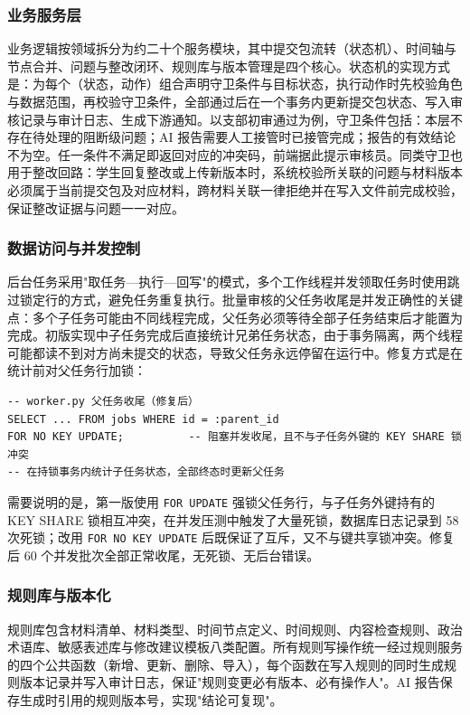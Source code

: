 \documentclass[12pt,a4paper]{ctexart}
\begin{document}
\subsubsection{业务服务层}

业务逻辑按领域拆分为约二十个服务模块，其中提交包流转（状态机）、时间轴与节点合并、问题与整改闭环、规则库与版本管理是四个核心。状态机的实现方式是：为每个（状态，动作）组合声明守卫条件与目标状态，执行动作时先校验角色与数据范围，再校验守卫条件，全部通过后在一个事务内更新提交包状态、写入审核记录与审计日志、生成下游通知。以支部初审通过为例，守卫条件包括：本层不存在待处理的阻断级问题；AI 报告需要人工接管时已接管完成；报告的有效结论不为空。任一条件不满足即返回对应的冲突码，前端据此提示审核员。同类守卫也用于整改回路：学生回复整改或上传新版本时，系统校验所关联的问题与材料版本必须属于当前提交包及对应材料，跨材料关联一律拒绝并在写入文件前完成校验，保证整改证据与问题一一对应。

\subsubsection{数据访问与并发控制}

后台任务采用"取任务—执行—回写"的模式，多个工作线程并发领取任务时使用跳过锁定行的方式，避免任务重复执行。批量审核的父任务收尾是并发正确性的关键点：多个子任务可能由不同线程完成，父任务必须等待全部子任务结束后才能置为完成。初版实现中子任务完成后直接统计兄弟任务状态，由于事务隔离，两个线程可能都读不到对方尚未提交的状态，导致父任务永远停留在运行中。修复方式是在统计前对父任务行加锁：

\begin{lstlisting}
-- worker.py 父任务收尾（修复后）
SELECT ... FROM jobs WHERE id = :parent_id
FOR NO KEY UPDATE;          -- 阻塞并发收尾，且不与子任务外键的 KEY SHARE 锁冲突
-- 在持锁事务内统计子任务状态，全部终态时更新父任务
\end{lstlisting}

需要说明的是，第一版使用 \texttt{FOR UPDATE} 强锁父任务行，与子任务外键持有的 KEY SHARE 锁相互冲突，在并发压测中触发了大量死锁，数据库日志记录到 58 次死锁；改用 \texttt{FOR NO KEY UPDATE} 后既保证了互斥，又不与键共享锁冲突。修复后 60 个并发批次全部正常收尾，无死锁、无后台错误。

\subsubsection{规则库与版本化}

规则库包含材料清单、材料类型、时间节点定义、时间规则、内容检查规则、政治术语库、敏感表述库与修改建议模板八类配置。所有规则写操作统一经过规则服务的四个公共函数（新增、更新、删除、导入），每个函数在写入规则的同时生成规则版本记录并写入审计日志，保证"规则变更必有版本、必有操作人"。AI 报告保存生成时引用的规则版本号，实现"结论可复现"。
\end{document}
